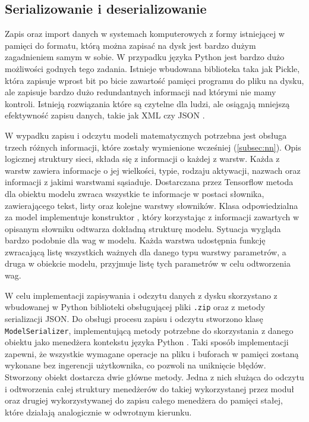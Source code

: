\subsection{Serializowanie i deserializowanie}
Zapis oraz import danych w systemach komputerowych z formy istniejącej w pamięci do formatu, którą można zapisać na dysk jest bardzo dużym zagadnieniem samym w sobie. W przypadku języka Python jest bardzo dużo możliwości godnych tego zadania. Istnieje wbudowana biblioteka taka jak Pickle, która zapisuje wprost bit po bicie zawartość pamięci programu do pliku na dysku, ale zapisuje bardzo dużo redundantnych informacji nad którymi nie mamy kontroli. Istnieją rozwiązania które są czytelne dla ludzi, ale osiągają mniejszą efektywność zapisu danych, takie jak XML \cite{book:xml_handbook} czy JSON \cite{book:json_for_begginers}. 

W wypadku zapisu i odczytu modeli matematycznych potrzebna jest obsługa trzech różnych informacji, które zostały wymienione wcześniej (\ref{subsec:nn}). Opis logicznej struktury sieci, składa się z informacji o każdej z warstw. Każda z warstw zawiera informacje o jej wielkości, typie, rodzaju aktywacji, nazwach oraz informacji z jakimi warstwami sąsiaduje. Dostarczana przez Tensorflow metoda dla obiektu modelu zwraca wszystkie te informacje w postaci słownika, zawierającego tekst, listy oraz kolejne warstwy słowników. Klasa odpowiedzialna za model implementuje konstruktor \cite{book:czysty_kod}, który korzystając z informacji zawartych w opisanym słowniku odtwarza dokładną strukturę modelu. Sytuacja wygląda bardzo podobnie dla wag w modelu. Każda warstwa udostępnia funkcję zwracającą listę wszystkich ważnych dla danego typu warstwy parametrów, a druga w obiekcie modelu, przyjmuje listę tych parametrów w celu odtworzenia wag.

W celu implementacji zapisywania i odczytu danych z dysku skorzystano z wbudowanej w Python biblioteki obsługującej pliki \verb+.zip+ oraz z metody serializacji JSON. Do obsługi procesu zapisu i odczytu stworzono klasę \verb+ModelSerializer+, implementującą metody potrzebne do skorzystania z danego obiektu jako menedżera kontekstu języka Python \cite{book:learning_python}. Taki sposób implementacji zapewni, że wszystkie wymagane operacje na pliku i buforach w pamięci zostaną wykonane bez ingerencji użytkownika, co pozwoli na uniknięcie błędów. Stworzony obiekt dostarcza dwie główne metody. Jedna z nich służąca do odczytu i odtworzenia całej struktury menedżerów do takiej wykorzystanej przez moduł oraz drugiej wykorzystywanej do zapisu całego menedżera do pamięci stałej, które działają analogicznie w odwrotnym kierunku.


